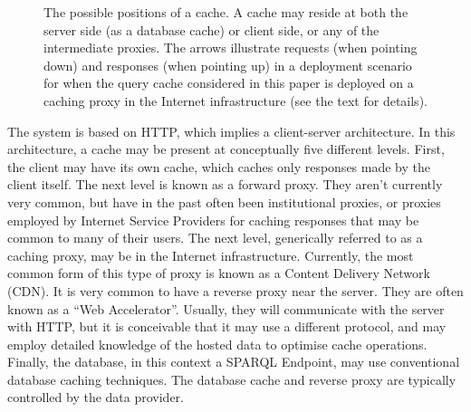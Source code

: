 \begin{figure}
\begin{center}
\caption{The possible positions of a cache. A cache may reside at both
  the server side (as a database cache) or client side, or any of the
  intermediate proxies. The arrows illustrate requests (when pointing
  down) and responses (when pointing up) in a deployment scenario for
  when the query cache considered in this paper is deployed on a
  caching proxy in the Internet infrastructure (see the text for
  details).}\label{fig:messaging}
\end{center}
\end{figure}

The system is based on HTTP, which implies a client-server
architecture. In this architecture, a cache may be present at
conceptually five different levels. First, the client may have its own
cache, which caches only responses made by the client itself. The next
level is known as a forward proxy. They aren't currently very common,
but have in the past often been institutional proxies, or proxies
employed by Internet Service Providers for caching responses that may
be common to many of their users. The next level, generically referred
to as a caching proxy, may be in the Internet
infrastructure. Currently, the most common form of this type of proxy
is known as a Content Delivery Network (CDN). It is very common to
have a reverse proxy near the server. They are often known as a ``Web
Accelerator''. Usually, they will communicate with the server with
HTTP, but it is conceivable that it may use a different protocol, and
may employ detailed knowledge of the hosted data to optimise cache
operations. Finally, the database, in this context a SPARQL Endpoint,
may use conventional database caching techniques. The database cache
and reverse proxy are typically controlled by the data provider.

